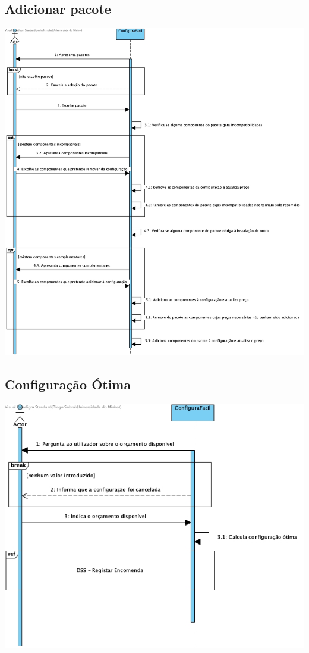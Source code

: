 \subsection{Adicionar pacote}
\begin{center}
 	\includegraphics[width = 5.5in]{DSS/DSS-Adiciona_Pacote.jpg}
\end{center}

\subsection{Configuração Ótima}
\begin{center}
 	\includegraphics[width = 5.5in]{DSS/DSS-Configuracao_otima.jpg}
\end{center}


